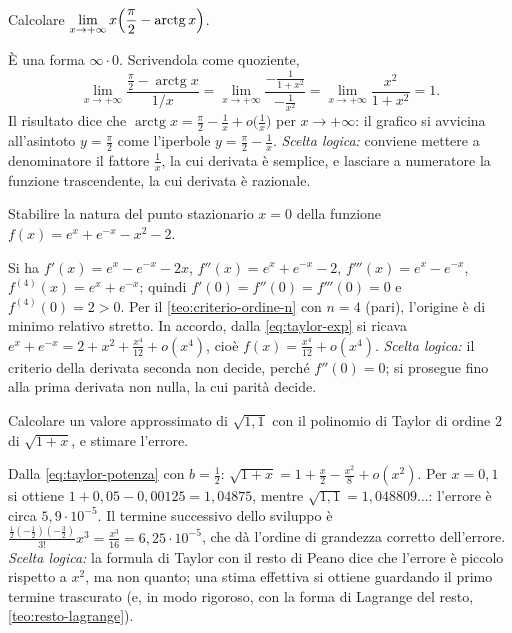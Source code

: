 \begin{esercizio}
Calcolare $\displaystyle\lim_{x\to+\infty}x\Bigl(\frac\pi2-\operatorname{arctg}x\Bigr)$.
\begin{soluzione}
È una forma $\infty\cdot0$. Scrivendola come quoziente,
\[
  \lim_{x\to+\infty}\frac{\frac\pi2-\operatorname{arctg}x}{1/x}
  =\lim_{x\to+\infty}\frac{-\frac1{1+x^{2}}}{-\frac1{x^{2}}}
  =\lim_{x\to+\infty}\frac{x^{2}}{1+x^{2}}=1 .
\]
Il risultato dice che $\operatorname{arctg}x=\frac\pi2-\frac1x+o\bigl(\frac1x\bigr)$ per
$x\to+\infty$: il grafico si avvicina all'asintoto $y=\frac\pi2$ come l'iperbole
$y=\frac\pi2-\frac1x$. \emph{Scelta logica:} conviene mettere a denominatore il fattore
$\frac1x$, la cui derivata è semplice, e lasciare a numeratore la funzione trascendente,
la cui derivata è razionale.
\end{soluzione}
\end{esercizio}

\begin{esercizio}
Stabilire la natura del punto stazionario $x=0$ della funzione
$f(x)=e^{x}+e^{-x}-x^{2}-2$.
\begin{soluzione}
Si ha $f'(x)=e^{x}-e^{-x}-2x$, $f''(x)=e^{x}+e^{-x}-2$, $f'''(x)=e^{x}-e^{-x}$,
$f^{(4)}(x)=e^{x}+e^{-x}$; quindi $f'(0)=f''(0)=f'''(0)=0$ e $f^{(4)}(0)=2>0$. Per il
\cref{teo:criterio-ordine-n} con $n=4$ (pari), l'origine è di minimo relativo stretto.
In accordo, dalla \eqref{eq:taylor-exp} si ricava
$e^{x}+e^{-x}=2+x^{2}+\frac{x^{4}}{12}+o(x^{4})$, cioè $f(x)=\frac{x^{4}}{12}+o(x^{4})$.
\emph{Scelta logica:} il criterio della derivata seconda non decide, perché
$f''(0)=0$; si prosegue fino alla prima derivata non nulla, la cui parità decide.
\end{soluzione}
\end{esercizio}

\begin{esercizio}
Calcolare un valore approssimato di $\sqrt{1{,}1}$ con il polinomio di Taylor di ordine
$2$ di $\sqrt{1+x}$, e stimare l'errore.
\begin{soluzione}
Dalla \eqref{eq:taylor-potenza} con $b=\frac12$:
$\sqrt{1+x}=1+\frac x2-\frac{x^{2}}8+o(x^{2})$. Per $x=0{,}1$ si ottiene
$1+0{,}05-0{,}00125=1{,}04875$, mentre $\sqrt{1{,}1}=1{,}048809\dots$: l'errore è circa
$5{,}9\cdot10^{-5}$. Il termine successivo dello sviluppo è
$\frac{\frac12(-\frac12)(-\frac32)}{3!}x^{3}=\frac{x^{3}}{16}=6{,}25\cdot10^{-5}$, che dà
l'ordine di grandezza corretto dell'errore. \emph{Scelta logica:} la formula di Taylor
con il resto di Peano dice che l'errore è piccolo rispetto a $x^{2}$, ma non quanto; una
stima effettiva si ottiene guardando il primo termine trascurato (e, in modo rigoroso,
con la forma di Lagrange del resto, \cref{teo:resto-lagrange}).
\end{soluzione}
\end{esercizio}

